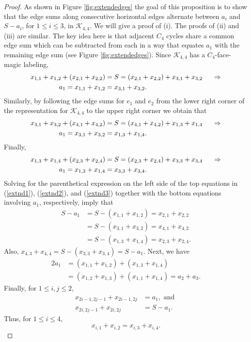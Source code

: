\documentclass[10pt, reqno]{amsart}
\theoremstyle{definition}
\theoremstyle{plain}
\begin{document}
\begin{proof}
  As shown in Figure \ref{fig:extendedges} the goal of this proposition is to show that the edge sums 
  along consecutive horizontal edges alternate between $a_i$ and $S-a_i$, for $1\le i\le 3$, in $\mathcal{K}_{4,4}$.
  We will give a proof of (i). The proofs of (ii) and (iii) are similar. 
  The key idea here is that adjacent $C_4$ cycles share a common edge sum which can be subtracted from each in a way that equates $a_1$ with the remaining edge sum (see Figure \ref{fig:extendedges}). Since $\mathcal{K}_{4,4}$ has a $C_4$-face-magic labeling,
  \begin{align}
      x_{1,1}+x_{1,2} +(x_{2,1}+x_{2,2}) & =S= (x_{2,1} + x_{2,2}) + x_{3,1} + x_{3,2}\hspace{.2in} \Rightarrow \label{extnd1}  \\
      a_1=x_{1,1}+x_{1,2}&=x_{3,1}+x_{3,2}. \notag 
  \end{align}
Similarly, by following the edge sums for $e_1$ and $e_2$ from the lower right corner of the representation for $\mathcal{K}_{4,4}$ to the upper right corner we obtain that 
\begin{align}
      x_{3,1}+x_{3,2} +(x_{4,1}+x_{4,2}) & =S= (x_{4,1} + x_{4,2}) + x_{1,3} + x_{1,4}\hspace{.2in} \Rightarrow \label{extnd2}\\
      a_1=x_{3,1}+x_{3,2}&=x_{1,3}+x_{1,4}. \notag
  \end{align}
Finally, 
\begin{align}
      x_{1,3}+x_{1,4} +(x_{2,3}+x_{2,4}) & =S= (x_{2,3} + x_{2,4}) + x_{3,3} + x_{3,4}\hspace{.2in} \Rightarrow   \label{extnd3}\\
      a_1=x_{1,3}+x_{1,4}&=x_{3,3}+x_{3,4}.  \notag
  \end{align}
Solving for the parenthetical expression on the left side of 
the top equations in
(\ref{extnd1}), (\ref{extnd2}), and (\ref{extnd3}) 
together with the bottom equations involving $a_1$, respectively, imply that 
\begin{align*}
    S-a_1&=S-(x_{1,1}+x_{1,2})=x_{2,1} + x_{2,2}\\
         &=S-(x_{3,1}+x_{3,2})=x_{4,1}+x_{4,2}\\
         &=S-(x_{1,3}+x_{1,4})=x_{2,3}+x_{2,4}.
\end{align*}
Also, $x_{4,3}+x_{4,4}=S-(x_{3,3}+x_{3,4})=S-a_1$.
Next, we have
\begin{align*}
    2a_1 &= (x_{1,1} + x_{1,2}) + (x_{1,3} + x_{1,4}) \\
    &= (x_{1,2} + x_{1,3}) + (x_{1,1} + x_{1,4}) = a_2 + a_3.
\end{align*}
Finally, for $1\le i,j\le 2$,
\begin{align*}
    x_{2i-1,2j-1} + x_{2i-1,2j} &= a_1, \text{ and } \\
    x_{2i,2j-1} + x_{2i,2j} &= S - a_1.
\end{align*}
Thus, for $1\le i\le 4$,
\begin{equation*} 
    x_{i,1} + x_{i,2} = x_{i,3} + x_{i,4}.
\end{equation*}
\end{proof}
\end{document}
